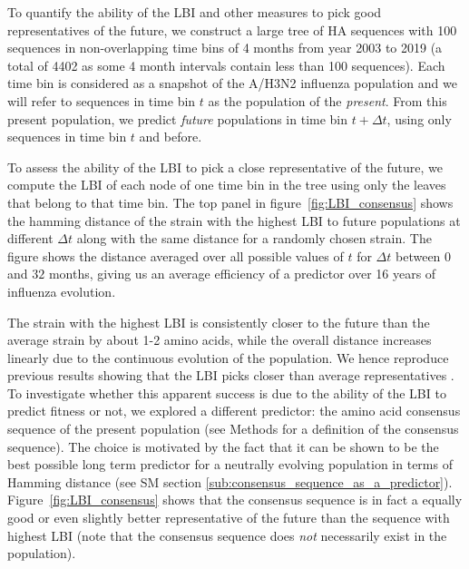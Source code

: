 \documentclass[reprint,amsmath,amssymb,superscriptaddress,showpacs,rmp]{revtex4-1}
\begin{document}
To quantify the ability of the LBI and other measures to pick good representatives of the future, we construct a large tree of HA sequences with 100 sequences in non-overlapping time bins of 4 months from year 2003 to 2019 (a total of 4402 as some 4 month intervals contain less than 100 sequences).
Each time bin is considered as a snapshot of the A/H3N2 influenza population and we will refer to sequences in time bin $t$ as the population of the \emph{present}.
From this present population, we predict \emph{future} populations in time bin $t+\Delta t$, using only sequences in time bin $t$ and before.

To assess the ability of the LBI to pick a close representative of the future, we compute the LBI of each node of one time bin in the tree using only the leaves that belong to that time bin.
The top panel in figure~\ref{fig:LBI_consensus} shows the hamming distance of the strain with the highest LBI to future populations at different $\Delta t$ along with the same distance for a randomly chosen strain.
The figure shows the distance averaged over all possible values of $t$ for $\Delta t$ between $0$ and $32$ months, giving us an average efficiency of a predictor over 16 years of influenza evolution.

The strain with the highest LBI is consistently closer to the future than the average strain by about 1-2 amino acids, while the overall distance increases linearly due to the continuous evolution of the population.
We hence reproduce previous results showing that the LBI picks closer than average representatives \citep{neher_predicting_2014}.
To investigate whether this apparent success is due to the ability of the LBI to predict fitness or not, we explored a different predictor: the amino acid consensus sequence of the present population (see Methods for a definition of the consensus sequence).
The choice is motivated by the fact that it can be shown to be the best possible long term predictor for a neutrally evolving population in terms of Hamming distance (see SM section \ref{sub:consensus_sequence_as_a_predictor}).
Figure~\ref{fig:LBI_consensus} shows that the consensus sequence is in fact a equally good or even slightly better representative of the future than the sequence with highest LBI
(note that the consensus sequence does \emph{not} necessarily exist in the population).
\end{document}
